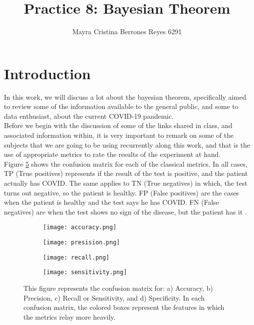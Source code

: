 \documentclass{article}
\begin{document}
\title{%
  Practice 8: Bayesian Theorem} %
\author{Mayra Cristina Berrones Reyes 6291}

\maketitle

\section{Introduction}

In this work, we will discuss a lot about the bayesian theorem, specifically aimed to review some of the information available to the general public, and some to data enthusiast, about the current COVID-19 pandemic. \\

Before we begin with the discussion of some of the links shared in class, and associated information within, it is very important to remark on some of the subjects that we are going to be using recurrently along this work, and that is the use of appropriate metrics to rate the results of the experiment at hand.\\

Figure \ref{fig1} shows the confusion matrix for each of the classical metrics. In all cases, TP (True positives) represents if the result of the test is positive, and the patient actually has COVID. The same applies to TN (True negatives) in which, the test turns out negative, so the patient is healthy. FP (False positives) are the cases when the patient is healthy and the test says he has COVID. FN (False negatives) are when the test shows no sign of the disease, but the patient has it \cite{mitesis}.\\

\begin{figure}[]
\begin{subfigure}{.24\textwidth}
  \centering
  \texttt{[image: accuracy.png]}  
  \caption{  }
  \label{sb1-1}
\end{subfigure}
\begin{subfigure}{.24\textwidth}
  \centering
  \texttt{[image: presision.png]}  
  \caption{ }
  \label{sb1-2}
\end{subfigure}
\begin{subfigure}{.24\textwidth}
  \centering
  \texttt{[image: recall.png]}  
  \caption{ }
  \label{sb1-3}
\end{subfigure}
\begin{subfigure}{.24\textwidth}
  \centering
  \texttt{[image: sensitivity.png]}  
  \caption{ }
  \label{sb1-4}
\end{subfigure}
	\caption{This figure represents the confusion matrix for: a) Accuracy, b) Precision, c) Recall or Sensitivity, and d) Specificity. In each confusion matrix, the colored boxes represent the features in which the metrics relay more heavily.}
\label{fig1}
\end{figure}
\end{document}
